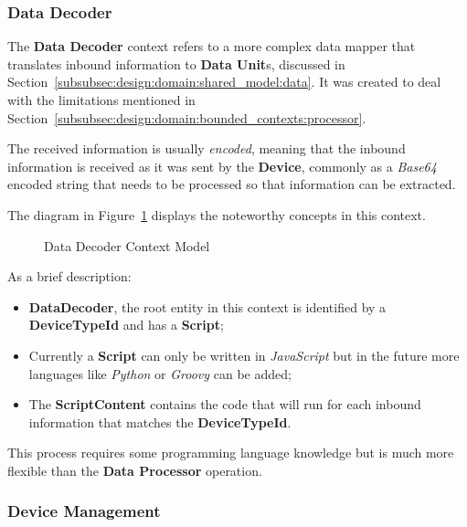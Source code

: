 \subsubsection{Data Decoder}
\label{subsubsec:design:domain:bounded_contexts:decoder}

The \textbf{Data Decoder} context refers to a more complex data mapper that translates inbound information to \textbf{Data Unit}s, discussed in Section~\ref{subsubsec:design:domain:shared_model:data}.
It was created to deal with the limitations mentioned in Section~\ref{subsubsec:design:domain:bounded_contexts:processor}.

The received information is usually \textit{encoded}, meaning that the inbound information is received as it was sent by the \textbf{Device}, commonly as a \textit{Base64} encoded string that needs to be processed so that information can be extracted.

The diagram in Figure~\ref{fig:design:domain:bounded_contexts:decoder:diagram} displays the noteworthy concepts in this context.

\begin{figure}[H]
   \centering
  \resizebox{\columnwidth}{!}
  {
     
  }
  \caption[Data Decoder Context Model]{Data Decoder Context Model}
  \label{fig:design:domain:bounded_contexts:decoder:diagram}
\end{figure}

As a brief description:

\begin{itemize}
   \item \textbf{DataDecoder}, the root entity in this context is identified by a \textbf{DeviceTypeId} and has a \textbf{Script};
   \item Currently a \textbf{Script} can only be written in \textit{JavaScript} but in the future more languages like \textit{Python} or \textit{Groovy} can be added;
   \item The \textbf{ScriptContent} contains the code that will run for each inbound information that matches the \textbf{DeviceTypeId}.
\end{itemize}

This process requires some programming language knowledge but is much more flexible than the \textbf{Data Processor} operation.

\subsubsection{Device Management}
\label{subsubsec:design:domain:bounded_contexts:device}

